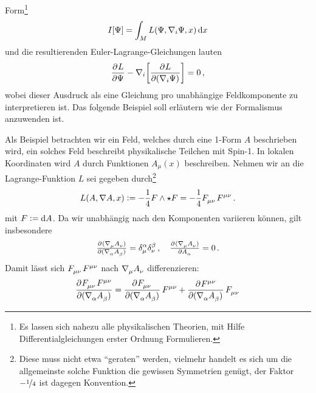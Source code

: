 Form\footnote{Es lassen sich nahezu alle physikalischen
Theorien, mit Hilfe Differentialgleichungen erster Ordnung Formulieren.}
\begin{equation}
I[\Psi]=\int_M L\left(\Psi,\nabla_i \Psi,x\right)\dif x
\end{equation}
und die resultierenden Euler-Lagrange-Gleichungen lauten
\begin{equation}
\dpd{L}{\Psi}
-\nabla_i\left[\dpd{L}{(\nabla_i\Psi)}\right]=0\,,
\end{equation}
wobei dieser Ausdruck als eine Gleichung pro
unabhängige Feldkomponente zu interpretieren ist. Das folgende Beispiel soll
erläutern wie der Formalismus anzuwenden ist.
\begin{beispiel} \label{bsp:Spinone}
Als Beispiel betrachten wir ein Feld, welches durch eine
1-Form $A$ beschrieben wird, ein solches Feld beschreibt physikalische Teilchen
mit Spin-1.
In lokalen Koordinaten wird $A$ durch Funktionen $A_\mu(x)$ beschreiben.
Nehmen wir an die Lagrange-Funktion $L$ sei gegeben durch\footnote{Diese muss
nicht etwa "`geraten"' werden, vielmehr handelt es sich um die allgemeinste
solche Funktion die gewissen Symmetrien genügt, der Faktor $-\nicefrac{1}{4}$ ist dagegen
Konvention.}
\begin{equation}
L(A,\nabla A,x):=-\frac{1}{4}F\wedge
\star F=-\frac{1}{4}\tensor{F}{_\mu_\nu}\tensor{F}{^\mu^\nu}\,.
\end{equation}
mit
$F:=\dif A$. Da wir unabhängig nach den Komponenten variieren können, gilt
insbesondere
\begin{equation}
\pd{(\tensor{\nabla}{_\mu}\tensor{A}{_\nu})}{(\tensor{\nabla}{_\alpha}\tensor{A}{_\beta})}
=\tensor*{\delta}{^\alpha_\mu}\tensor*{\delta}{^\beta_\nu}\,,\quad
\pd{(\tensor{\nabla}{_\mu}\tensor{A}{_\nu})}{\tensor{A}{_\alpha}}=0\,.
\end{equation}
Damit lässt sich $\tensor{F}{_\mu_\nu}\tensor{F}{^\mu^\nu}$ nach
$\tensor{\nabla}{_\mu}\tensor{A}{_\nu}$ differenzieren:
\begin{equation}
\begin{split}
\dpd{\tensor{F}{_\mu_\nu}\tensor{F}{^\mu^\nu}}{(\tensor{\nabla}{_\alpha}\tensor{A}{_\beta})}
&=\dpd{\tensor{F}{_\mu_\nu}}{(\tensor{\nabla}{_\alpha}\tensor{A}{_\beta})}\tensor{F}{^\mu^\nu}
 +\dpd{\tensor{F}{^\mu^\nu}}{(\tensor{\nabla}{_\alpha}\tensor{A}{_\beta})}\tensor{F}{_\mu_\nu}
 \\

\end{split}
\end{equation}
\end{beispiel}
